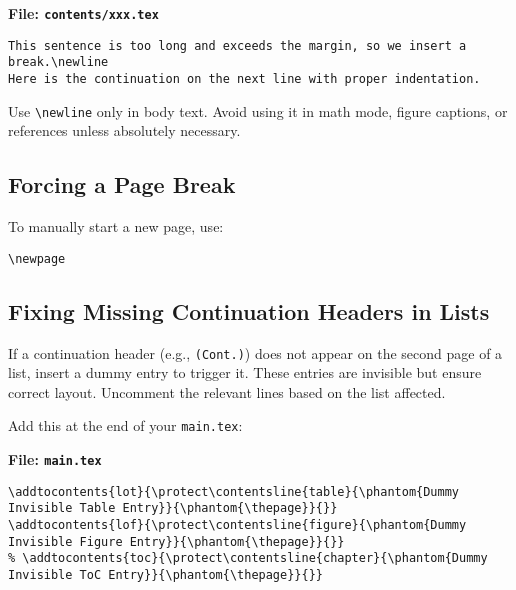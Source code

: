 \documentclass{VISTEC}
\begin{document}
\noindent\textbf{File: \texttt{contents/xxx.tex}}\vspace{-1.5em}
\begin{verbatim}
This sentence is too long and exceeds the margin, so we insert a break.\newline
Here is the continuation on the next line with proper indentation.
\end{verbatim}

\begin{subparagraph}
Use \verb|\newline| only in body text. Avoid using it in math mode, figure captions, or references unless absolutely necessary.
\end{subparagraph}

\subsection{Forcing a Page Break}

\begin{subparagraph}
To manually start a new page, use:
\end{subparagraph}

\begin{verbatim}
\newpage
\end{verbatim}

\subsection{Fixing Missing Continuation Headers in Lists}


\begin{subparagraph}
If a continuation header (e.g., \texttt{(Cont.)}) does not appear on the second page of a list, insert a dummy entry to trigger it. These entries are invisible but ensure correct layout. Uncomment the relevant lines based on the list affected.
\end{subparagraph}

\begin{subparagraph}
Add this at the end of your \texttt{main.tex}:
\end{subparagraph}

\noindent\textbf{File: \texttt{main.tex}}\vspace{-1.5em}
\begin{verbatim}
\addtocontents{lot}{\protect\contentsline{table}{\phantom{Dummy Invisible Table Entry}}{\phantom{\thepage}}{}}
\addtocontents{lof}{\protect\contentsline{figure}{\phantom{Dummy Invisible Figure Entry}}{\phantom{\thepage}}{}}
% \addtocontents{toc}{\protect\contentsline{chapter}{\phantom{Dummy Invisible ToC Entry}}{\phantom{\thepage}}{}}
\end{verbatim}
\end{document}
